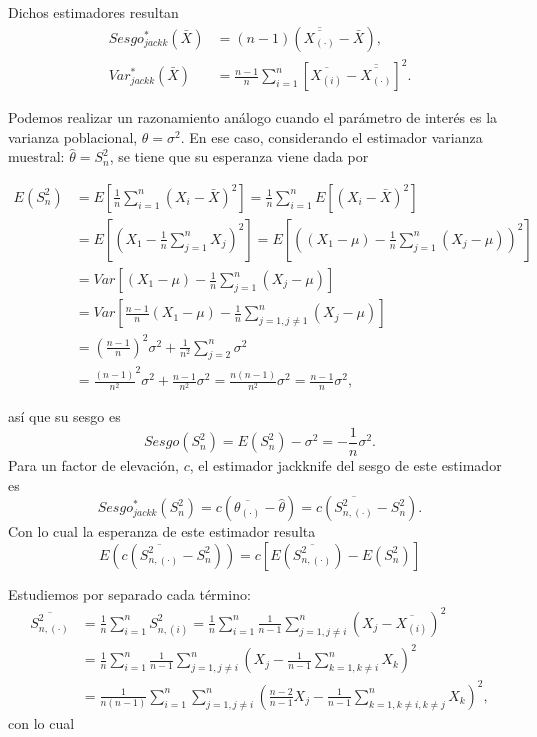 \documentclass[
]{book}
\theoremstyle{break}
\theoremstyle{definition}
\theoremstyle{definition}
\theoremstyle{definition}
\theoremstyle{definition}
\theoremstyle{remark}
\begin{document}
Dichos estimadores resultan
\[\begin{aligned}
Sesgo_{jackk}^{\ast}\left( \bar{X} \right) 
&= \left( n-1 \right) \left( \overline{\overline{X_{(\cdot)}}}-\bar{X} \right), \\
Var_{jackk}^{\ast}\left( \bar{X} \right) 
&= \frac{n-1}{n}\sum_{i=1}^{n}\left[ \overline{X_{(i)}}
- \overline{\overline{X_{\left( \cdot \right)}}}\right]^2.
\end{aligned}\]

Podemos realizar un razonamiento análogo cuando el parámetro de interés
es la varianza poblacional, \(\theta =\sigma^2\). En ese caso,
considerando el estimador varianza muestral: \(\hat{\theta}=S_n^2\),
se tiene que su esperanza viene dada por

\[\begin{aligned}
E\left( S_n^2 \right) 
&= E\left[ \frac{1}{n}\sum_{i=1}^{n}\left( X_i- \bar{X} \right)^2\right] 
= \frac{1}{n}\sum_{i=1}^{n}E\left[ \left(X_i-\bar{X} \right)^2\right] \\
&= E\left[ \left( X_1-\frac{1}{n}\sum_{j=1}^{n}X_j \right)^2\right] 
= E \left[ \left( \left( X_1-\mu \right) 
- \frac{1}{n}\sum_{j=1}^{n}\left( X_j-\mu \right) \right)^2\right] \\
&= Var\left[ \left( X_1-\mu \right) 
- \frac{1}{n}\sum_{j=1}^{n}\left(X_j-\mu \right) \right] \\
&= Var\left[ \frac{n-1}{n}\left( X_1-\mu \right) 
- \frac{1}{n}\sum_{j=1,j\neq 1}^{n}\left( X_j-\mu \right) \right] \\
&= \left( \frac{n-1}{n} \right)^2\sigma^2+\frac{1}{n^2}\sum_{j=2}^{n}\sigma^2 \\
&= \frac{\left( n-1 \right)}{n^2}^2\sigma^2+\frac{n-1}{n^2}\sigma^2
=\frac{n\left( n-1 \right)}{n^2}\sigma^2=\frac{n-1}{n}\sigma^2,
\end{aligned}\]

así que su sesgo es
\[Sesgo\left( S_n^2 \right) =E\left( S_n^2 \right) -\sigma^2=-\frac{1}{n}\sigma^2.\]
Para un factor de elevación, \(c\), el estimador jackknife del sesgo de este estimador es
\[Sesgo_{jackk}^{\ast}\left( S_n^2 \right) 
= c\left( \overline{\theta_{(\cdot)}}-\hat{\theta} \right) 
= c\left( \overline{S_{n,(\cdot)}^2}-S_n^2 \right).\]
Con lo cual la esperanza de este estimador resulta
\[E\left( c\left( \overline{S_{n,(\cdot)}^2}-S_n^2 \right) \right) 
= c\left[ E\left( \overline{S_{n,(\cdot)}^2} \right) - E\left( S_n^2 \right) \right]\]

Estudiemos por separado cada término:
\[\begin{aligned}
\overline{S_{n,(\cdot)}^2} &= \frac{1}{n}\sum_{i=1}^{n}S_{n,(i)}^2
= \frac{1}{n}\sum_{i=1}^{n}\frac{1}{n-1}\sum_{j=1,j\neq i}^{n}\left( X_j-\overline{X_{(i)}} \right)^2 \\
&= \frac{1}{n}\sum_{i=1}^{n}\frac{1}{n-1}\sum_{j=1,j\neq i}^{n}\left( X_j 
- \frac{1}{n-1}\sum_{k=1,k\neq i}^{n}X_{k} \right)^2 \\
&= \frac{1}{n\left( n-1 \right)}\sum_{i=1}^{n}\sum_{j=1,j\neq i}^{n}\left( 
\frac{n-2}{n-1}X_j-\frac{1}{n-1}\sum_{k=1,k\neq i,k\neq j}^{n}X_{k} \right)^2,
\end{aligned}\]
con lo cual
\end{document}
